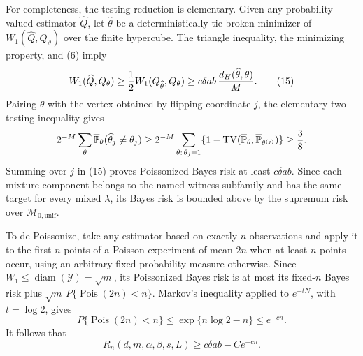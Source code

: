 For completeness, the testing reduction is elementary.  Given any probability-valued estimator \(\widehat Q\), let \(\widehat\theta\) be a deterministically tie-broken minimizer of \(W_1(\widehat Q,Q_\vartheta)\) over the finite hypercube.  The triangle inequality, the minimizing property, and (6) imply
\[
 W_1(\widehat Q,Q_\theta)
 \geq {1\over2}W_1(Q_{\widehat\theta},Q_\theta)
 \geq c\delta ab\,{d_H(\widehat\theta,\theta)\over M}.
 \tag{15}
\]
Pairing \(\theta\) with the vertex obtained by flipping coordinate \(j\), the elementary two-testing inequality gives
\[
 2^{-M}\sum_\theta
 \overline{\mathbb P}_\theta(\widehat\theta_j\neq\theta_j)
 \geq 2^{-M}\sum_{\theta:\,\theta_j=1}
       \{1-\operatorname{TV}(\overline{\mathbb P}_\theta,
                  \overline{\mathbb P}_{\theta^{(j)}})\}
 \geq {3\over8}.
\]
Summing over \(j\) in (15) proves Poissonized Bayes risk at least \(c\delta ab\).  Since each mixture component belongs to the named witness subfamily and has the same target for every mixed \(\lambda\), its Bayes risk is bounded above by the supremum risk over \(\mathcal M_{0,\mathrm{unif}}\).

To de-Poissonize, take any estimator based on exactly \(n\) observations and apply it to the first \(n\) points of a Poisson experiment of mean \(2n\) when at least \(n\) points occur, using an arbitrary fixed probability measure otherwise.  Since \(W_1\leq\operatorname{diam}(\mathcal Y)=\sqrt m\), its Poissonized Bayes risk is at most its fixed-\(n\) Bayes risk plus \(\sqrt m\,P\{\operatorname{Pois}(2n)<n\}\).  Markov's inequality applied to \(e^{-tN}\), with \(t=\log2\), gives
\[
 P\{\operatorname{Pois}(2n)<n\}
 \leq\exp\{n\log2-n\} \leq e^{-cn}.
\]
It follows that
\[
 R_n(d,m,\alpha,\beta,s,L)\geq c\delta ab-Ce^{-cn}.
 \tag{16}
\]


